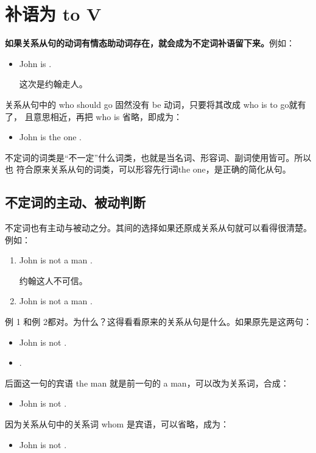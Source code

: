 \section{补语为 to V}

\textbf{如果关系从句的动词有情态助动词存在，就会成为不定词补语留下来。}例如：
\begin{itemize}
\item John is  .

  这次是约翰走人。
\end{itemize}
关系从句中的 who should go 固然没有 be 动词，只要将其改成 who is to go就有了，
且意思相近，再把 who is 省略，即成为：
\begin{itemize}
\item   John is the one .
\end{itemize}

不定词的词类是“不一定”什么词类，也就是当名词、形容词、副词使用皆可。所以也
符合原来关系从句的词类，可以形容先行词the one，是正确的简化从句。

\subsection{不定词的主动、被动判断}

不定词也有主动与被动之分。其间的选择如果还原成关系从句就可以看得很清楚。例如：
\begin{enumerate}
\item John is not a man .

  约翰这人不可信。
\item John is not a man  .
\end{enumerate}
例 1 和例 2都对。为什么？这得看看原来的关系从句是什么。如果原先是这两句：
\begin{itemize}
\item John is not .
\item {}  .
\end{itemize}
后面这一句的宾语 the man 就是前一句的 a man，可以改为关系词，合成：
\begin{itemize}
\item John is not  .
\end{itemize}

因为关系从句中的关系词 whom 是宾语，可以省略，成为：
\begin{itemize}
\item John is not  .
\end{itemize}

